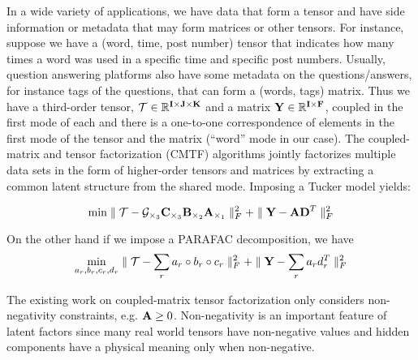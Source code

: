 \label{sec:problem}
In a wide variety of applications, we have data that form a tensor
and have side information or metadata that may form matrices or other tensors.
For instance, suppose we have a (word, time, post number) tensor that indicates how many times a word was used in a specific time and specific post numbers. Usually, question answering platforms also have some metadata on the
questions/answers, for instance tags of the questions, that can form a (words, tags) matrix. Thus  we have a third-order tensor, ${\mathbf{\mathcal{T}}} \in {\mathbb R}^{{\mathbf{I}} \times {\ensuremath{\mathbf{J}}} \times {\ensuremath{\mathbf{K}}}}$ and a matrix ${\mathbf{Y}} \in {\mathbb R}^{{\mathbf{I}} \times {\ensuremath{\mathbf{F}}}}$, coupled in the first mode of each and there is a one-to-one correspondence of elements in the first mode of the tensor and the matrix (``word'' mode in our case). The coupled-matrix and tensor factorization (CMTF) algorithms  jointly factorizes multiple data sets in the form of higher-order tensors and matrices by extracting a common latent structure from the shared mode.
Imposing a Tucker model yields:


\begin{equation}\label{eq:coupledConc}
\min  \parallel{\ensuremath{\mathbf{\mathcal{T}}}} - {\mathbf{\mathcal{G}}}_{\times_{3}} {\mathbf{C}}_{\times_{3}} {\mathbf{B}}_{\times_{2}} {\mathbf{A}}_{\times_{1}}\parallel_{F}^{2} + \parallel {\ensuremath{\mathbf{Y}}} - {\mathbf{A}}{\mathbf{D}}^{T}  \parallel_{F}^{2} 
\end{equation}

On the other hand if we impose a PARAFAC decomposition, we have
\begin{equation}\label{eq:coupled_cp}
\min\limits_{a_{r}, b_{r}, c_{r}, d_{r}}  \parallel {\ensuremath{\mathbf{\mathcal{T}}}} - \sum\limits_{r}   a_r \circ b_r  \circ c_r   \parallel_{F}^{2}  + \parallel {\ensuremath{\mathbf{Y}}} - \sum\limits_{r} a_r d_{r}^{T}  \parallel_{F}^{2}
\end{equation}

The existing work on coupled-matrix tensor factorization only considers non-negativity constraints, e.g. ${\mathbf{A}} \geq 0$. 
Non-negativity is an important feature of latent factors since many real world tensors have non-negative values and hidden components have a physical meaning only when non-negative. 

